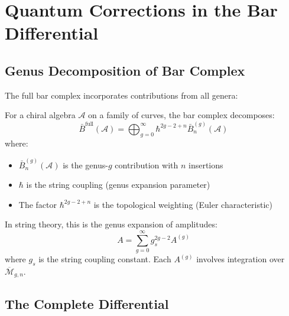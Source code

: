 
\section{Quantum Corrections in the Bar Differential}
\label{sec:quantum-corrections-bar}

\subsection{Genus Decomposition of Bar Complex}

The full bar complex incorporates contributions from all genera:

\begin{definition}
\label{def:genus-stratified-bar}
For a chiral algebra $\mathcal{A}$ on a family of curves, the bar complex decomposes:
\begin{equation}
\bar{B}^{\text{full}}(\mathcal{A}) = \bigoplus_{g=0}^\infty \hbar^{2g-2+n} \bar{B}^{(g)}_n(\mathcal{A})
\end{equation}
where:
\begin{itemize}
\item $\bar{B}^{(g)}_n(\mathcal{A})$ is the genus-$g$ contribution with $n$ insertions
\item $\hbar$ is the string coupling (genus expansion parameter)
\item The factor $\hbar^{2g-2+n}$ is the topological weighting (Euler characteristic)
\end{itemize}
\end{definition}

\begin{remark}
\label{rem:string-theory-genus}
In string theory, this is the genus expansion of amplitudes:
\begin{equation}
A = \sum_{g=0}^\infty g_s^{2g-2} A^{(g)}
\end{equation}
where $g_s$ is the string coupling constant. Each $A^{(g)}$ involves integration over $\overline{\mathcal{M}}_{g,n}$.
\end{remark}

\subsection{The Complete Differential}

